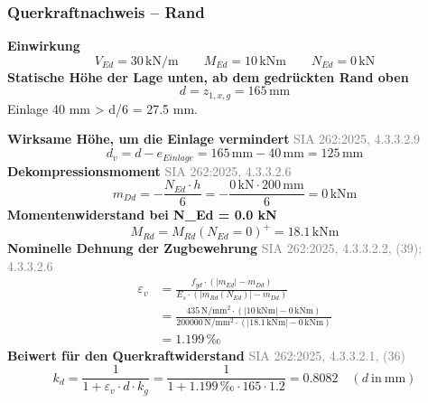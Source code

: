 \documentclass[11pt,a4paper]{article}
\newcommand{\normref}[1]{{\small\textcolor{gray}{#1}}}
\begin{document}
\subsubsection{Querkraftnachweis – Rand}
\noindent\textbf{Einwirkung}
\begin{equation*}
V_{Ed} = 30\,\mathrm{kN}/\mathrm{m} \qquad M_{Ed} = 10\,\mathrm{kNm} \qquad N_{Ed} = 0\,\mathrm{kN}
\end{equation*}
\noindent\textbf{Statische Höhe der Lage unten, ab dem gedrückten Rand oben}
\begin{equation*}
d = z_{1,x,g} = 165\,\mathrm{mm}
\end{equation*}
Einlage 40 mm > d/6 = 27.5 mm.

\noindent\textbf{Wirksame Höhe, um die Einlage vermindert} \hfill \normref{SIA 262:2025, 4.3.3.2.9}
\begin{equation*}
d_v = d - e_{Einlage} = 165\,\mathrm{mm} - 40\,\mathrm{mm} = 125\,\mathrm{mm}
\end{equation*}
\noindent\textbf{Dekompressionsmoment} \hfill \normref{SIA 262:2025, 4.3.3.2.6}
\begin{equation*}
m_{Dd} = -\frac{N_{Ed} \cdot h}{6} = -\frac{0\,\mathrm{kN} \cdot 200\,\mathrm{mm}}{6} = 0\,\mathrm{kNm}
\end{equation*}
\noindent\textbf{Momentenwiderstand bei N\_Ed = 0.0 kN}
\begin{equation*}
M_{Rd} = M_{Rd}(N_{Ed}=0)^{+} = 18.1\,\mathrm{kNm}
\end{equation*}
\noindent\textbf{Nominelle Dehnung der Zugbewehrung} \hfill \normref{SIA 262:2025, 4.3.3.2.2, (39); 4.3.3.2.6}
\begin{equation*}
\begin{aligned}
  \varepsilon_v &= \frac{f_{yd} \cdot \left(\left|m_{Ed}\right| - m_{Dd}\right)}{E_s \cdot \left(\left|m_{Rd}(N_{Ed})\right| - m_{Dd}\right)} \\
  &= \frac{435\,\mathrm{N}/\mathrm{mm}^{2} \cdot \left(\left|10\,\mathrm{kNm}\right| - 0\,\mathrm{kNm}\right)}{200000\,\mathrm{N}/\mathrm{mm}^{2} \cdot \left(\left|18.1\,\mathrm{kNm}\right| - 0\,\mathrm{kNm}\right)} \\
  &= 1.199\,\text{‰}
\end{aligned}
\end{equation*}
\noindent\textbf{Beiwert für den Querkraftwiderstand} \hfill \normref{SIA 262:2025, 4.3.3.2.1, (36)}
\begin{equation*}
k_d = \frac{1}{1 + \varepsilon_v \cdot d \cdot k_g} = \frac{1}{1 + 1.199\,\text{‰} \cdot 165 \cdot 1.2} = 0.8082 \quad \left(d\ \text{in}\ \mathrm{mm}\right)
\end{equation*}
\end{document}
